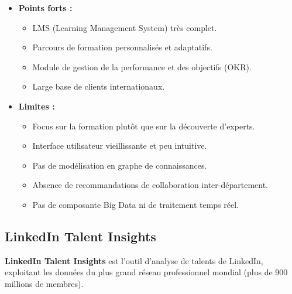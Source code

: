 \documentclass[12pt,a4paper]{article}
\begin{document}
\begin{itemize}[leftmargin=*]
    \item \textbf{Points forts :}
    \begin{itemize}[leftmargin=*, label=--]
        \item LMS (Learning Management System) très complet.
        \item Parcours de formation personnalisés et adaptatifs.
        \item Module de gestion de la performance et des objectifs (OKR).
        \item Large base de clients internationaux.
    \end{itemize}
    \item \textbf{Limites :}
    \begin{itemize}[leftmargin=*, label=--]
        \item Focus sur la formation plutôt que sur la découverte d'experts.
        \item Interface utilisateur vieillissante et peu intuitive.
        \item Pas de modélisation en graphe de connaissances.
        \item Absence de recommandations de collaboration inter-département.
        \item Pas de composante Big Data ni de traitement temps réel.
    \end{itemize}
\end{itemize}

\subsection{LinkedIn Talent Insights}

\textbf{LinkedIn Talent Insights} est l'outil d'analyse de talents de LinkedIn, exploitant les données du plus grand réseau professionnel mondial (plus de 900 millions de membres).
\end{document}
